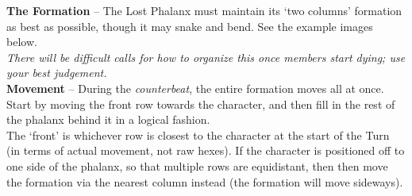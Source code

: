 \textbf{The Formation} -- The Lost Phalanx must maintain its ‘two columns’ formation as best as possible, though it may snake and bend. See the example images below.\\
\emph{There will be difficult calls for how to organize this once members start dying; use your best judgement.}\\

\textbf{Movement} -- During the \emph{counterbeat}, the entire formation moves all at once. Start by moving the front row towards the character, and then fill in the rest of the phalanx behind it in a logical fashion.\\
The ‘front’ is whichever row is closest to the character at the start of the Turn (in terms of actual movement, not raw hexes). If the character is positioned off to one side of the phalanx, so that multiple rows are equidistant, then then move the formation via the nearest column instead (the formation will move sideways).


